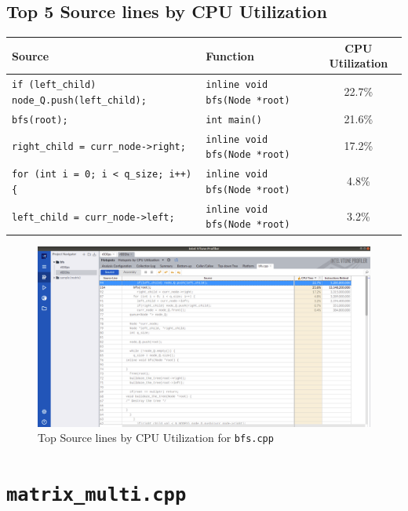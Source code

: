 \documentclass[11pt, swedish, openany]{book}
\begin{document}
\subsection*{Top 5 Source lines by CPU Utilization}
\begin{table}[H]
    \begin{tabular}{||l|l||c||}
        \hline
        Source                                               & Function                             & CPU Utilization \\
        \hline
        \texttt{if (left\_child) node\_Q.push(left\_child);} & \texttt{inline void bfs(Node *root)} & 22.7\%          \\
        \texttt{bfs(root);}                                  & \texttt{int main()}                  & 21.6\%          \\
        \texttt{right\_child = curr\_node->right;}           & \texttt{inline void bfs(Node *root)} & 17.2\%          \\
        \texttt{for (int i = 0; i < q\_size; i++) \{}        & \texttt{inline void bfs(Node *root)} & 4.8\%           \\
        \texttt{left\_child = curr\_node->left;}             & \texttt{inline void bfs(Node *root)} & 3.2\%           \\
        \hline
    \end{tabular}
\end{table}

\begin{figure}[H]
    \centering
    \includegraphics[scale=0.25]{vtune/bfs/sc.png}
    \caption{Top Source lines by CPU Utilization for \texttt{bfs.cpp}}
\end{figure}

\newpage
\section{\texttt{matrix\_multi.cpp}}
\end{document}
